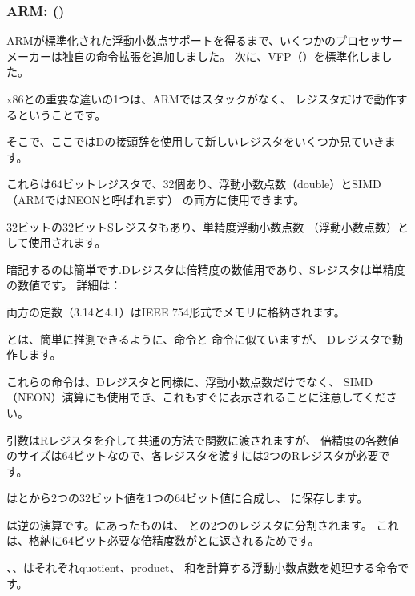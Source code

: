 ﻿\subsubsection{ARM: \OptimizingXcodeIV (\ARMMode)}

ARMが標準化された浮動小数点サポートを得るまで、いくつかのプロセッサーメーカーは独自の命令拡張を追加しました。 
次に、VFP（）を標準化しました。

x86との重要な違いの1つは、ARMではスタックがなく、
レジスタだけで動作するということです。




そこで、ここではDの接頭辞を使用して新しいレジスタをいくつか見ていきます。

これらは64ビットレジスタで、32個あり、浮動小数点数（double）とSIMD（ARMではNEONと呼ばれます）
の両方に使用できます。

32ビットの32ビットSレジスタもあり、単精度浮動小数点数
（浮動小数点数）として使用されます。

暗記するのは簡単です.Dレジスタは倍精度の数値用であり、Sレジスタは単精度の数値です。
詳細は：

両方の定数（3.14と4.1）はIEEE 754形式でメモリに格納されます。

とは、簡単に推測できるように、命令と \MOV 命令に似ていますが、
Dレジスタで動作します。

これらの命令は、Dレジスタと同様に、浮動小数点数だけでなく、
SIMD（NEON）演算にも使用でき、これもすぐに表示されることに注意してください。

引数はRレジスタを介して共通の方法で関数に渡されますが、
倍精度の各数値のサイズは64ビットなので、各レジスタを渡すには2つのRレジスタが必要です。

はとから2つの32ビット値を1つの64ビット値に合成し、
に保存します。

は逆の演算です。にあったものは、
との2つのレジスタに分割されます。
これは、格納に64ビット必要な倍精度数がとに返されるためです。

、、はそれぞれ\gls{quotient}、\gls{product}、
和を計算する浮動小数点数を処理する命令です。

